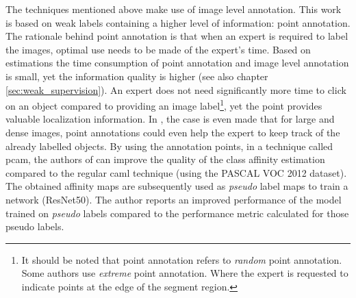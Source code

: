 \par{
    The techniques mentioned above make use of image level annotation.
    This work is based on weak labels containing a higher level of information: point annotation.
    The rationale behind point annotation is that when an expert is required to label the images, optimal use needs to be made of the expert's time.
    Based on estimations \cite{Bearman2015} the time consumption of point annotation and image level annotation is small, yet the information quality is higher (see also chapter \ref{sec:weak_supervision}).
    An expert does not need significantly more time to click on an object compared to providing an image label\footnote{
        It should be noted that point annotation refers to \textit{random} point annotation. Some authors \cite{Maninis2018} use \textit{extreme} point annotation. 
        Where the expert is requested to indicate points at the edge of the segment region.
    }, yet the point provides valuable localization information.
    In \cite{McEver2020}, the case is even made that for large and dense images, point annotations could even help the expert to keep track of the already labelled objects.
    By using the annotation points, in a technique called \acrfull{pcam}, the authors of \cite{McEver2020} can improve the quality of the class affinity estimation compared to the regular \Gls{caml} technique (using the PASCAL VOC 2012 dataset).
    The obtained affinity maps are subsequently used as \textit{pseudo} label maps to train a network (ResNet50). 
    The author reports an improved performance of the model trained on \textit{pseudo} labels compared to the performance metric calculated for those pseudo labels.
}

